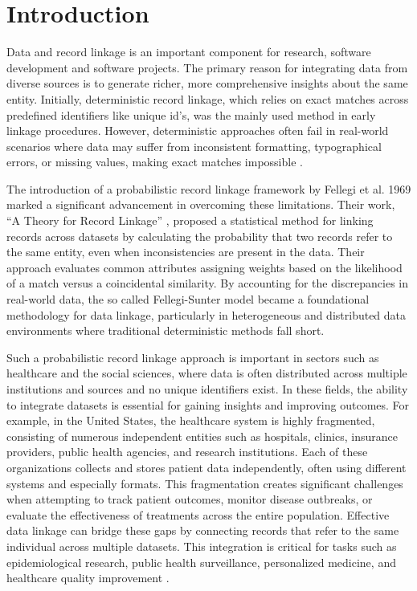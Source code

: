 \chapter{Introduction}  \label{sec:introduction}

Data and record linkage is an important component for research, software development and software projects.
The primary reason for integrating data from diverse sources is to generate richer, more comprehensive insights about the same entity.
Initially, deterministic record linkage, which relies on exact matches across predefined identifiers like unique id's, was the mainly used method in early linkage procedures. 
However, deterministic approaches often fail in real-world scenarios where data may suffer from inconsistent formatting, typographical errors, or missing values, making exact matches impossible \cite{herzog2007data}.

The introduction of a probabilistic record linkage framework by Fellegi et al. 1969 \cite{fellegi1969theory} marked a significant advancement in overcoming these limitations. 
Their work, \enquote{A Theory for Record Linkage} \cite{fellegi1969theory}, proposed a statistical method for linking records across datasets by calculating the probability that two records refer to the same entity, even when inconsistencies are present in the data. 
Their approach evaluates common attributes assigning weights based on the likelihood of a match versus a coincidental similarity. 
By accounting for the discrepancies in real-world data, the so called Fellegi-Sunter model became a foundational methodology for data linkage, particularly in heterogeneous and distributed data environments where traditional deterministic methods fall short.

Such a probabilistic record linkage approach is important in sectors such as healthcare and the social sciences, where data is often distributed across multiple institutions and sources and no unique identifiers exist. 
In these fields, the ability to integrate datasets is essential for gaining insights and improving outcomes.
For example, in the United States, the healthcare system is highly fragmented, consisting of numerous independent entities such as hospitals, clinics, insurance providers, public health agencies, and research institutions. 
Each of these organizations collects and stores patient data independently, often using different systems and especially formats. 
This fragmentation creates significant challenges when attempting to track patient outcomes, monitor disease outbreaks, or evaluate the effectiveness of treatments across the entire population.
Effective data linkage can bridge these gaps by connecting records that refer to the same individual across multiple datasets.
This integration is critical for tasks such as epidemiological research, public health surveillance, personalized medicine, and healthcare quality improvement \cite{pathak2024privacy, vatsalan2017privacy}.

